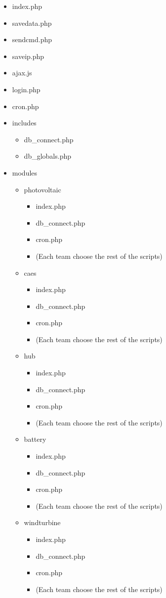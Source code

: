 \begin{itemize}
	\item index.php
	\item savedata.php
	\item sendcmd.php
	\item saveip.php
	\item ajax.js
	\item login.php 
	\item cron.php 
	\item includes\/ 
	\begin{itemize}
		\item db\_connect.php
		\item db\_globals.php
	\end{itemize} 
	\item modules\/ 
		\begin{itemize}
		\item photovoltaic\/ 
			\begin{itemize}
				\item index.php
				\item db\_connect.php
				\item cron.php 
				\item (Each team choose the rest of the scripts) 
			\end{itemize}
		\item caes\/ 
			\begin{itemize}
				\item index.php 
				\item db\_connect.php 
				\item cron.php 
				\item (Each team choose the rest of the scripts) 
			\end{itemize}
		\item hub\/
			\begin{itemize} 
				\item index.php 
				\item db\_connect.php 
				\item cron.php 
				\item (Each team choose the rest of the scripts) 
			\end{itemize}
		\item battery\/ 
			\begin{itemize}
				\item index.php 
				\item db\_connect.php 
				\item cron.php 
				\item (Each team choose the rest of the scripts) 
			\end{itemize}
		\item windturbine\/ 
			\begin{itemize}
				\item index.php 
				\item db\_connect.php 
				\item cron.php 
				\item (Each team choose the rest of the scripts)
			\end{itemize}
	\end{itemize}
\end{itemize}

